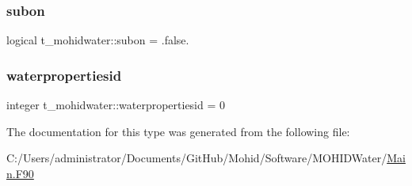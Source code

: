 \mbox{\label{structt__mohidwater_a819a96f8e0e8111541b690cae104cedf}} 
\subsubsection{\texorpdfstring{subon}{subon}}
{\footnotesize\ttfamily logical t\+\_\+mohidwater\+::subon = .false.}

\mbox{\label{structt__mohidwater_a7357bc7c465189d816f7e9b274f28f3b}} 
\subsubsection{\texorpdfstring{waterpropertiesid}{waterpropertiesid}}
{\footnotesize\ttfamily integer t\+\_\+mohidwater\+::waterpropertiesid = 0}



The documentation for this type was generated from the following file\+:\begin{DoxyCompactItemize}
\item 
C\+:/\+Users/administrator/\+Documents/\+Git\+Hub/\+Mohid/\+Software/\+M\+O\+H\+I\+D\+Water/\mbox{\hyperlink{_main_8_f90}{Main.\+F90}}\end{DoxyCompactItemize}

